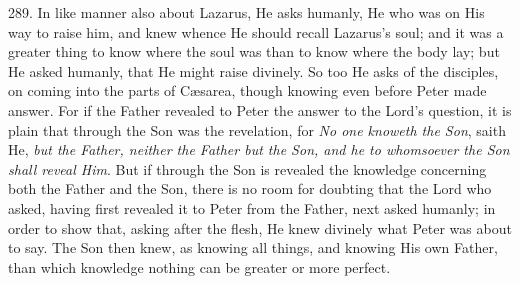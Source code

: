 289.
In like manner also about Lazarus, He asks humanly, He who was on His
way to raise him, and knew whence He should recall Lazarus's soul; and
it was a greater thing to know where the soul was than to know where
the body lay; but He asked humanly, that He might raise divinely. So
too He asks of the disciples, on coming into the parts of Cæsarea,
though knowing even before Peter made answer. For if the Father
revealed to Peter the answer to the Lord's question, it is plain that
through the Son was the revelation, for \emph{No one knoweth the Son},
saith He, \emph{but the Father, neither the Father but the Son, and he to
whomsoever the Son shall reveal Him}. But if through the Son is
revealed the knowledge concerning both the Father and the Son, there
is no room for doubting that the Lord who asked, having first revealed
it to Peter from the Father, next asked humanly; in order to show
that, asking after the flesh, He knew divinely what Peter was about to
say. The Son then knew, as knowing all things, and knowing His own
Father, than which knowledge nothing can be greater or more perfect.

